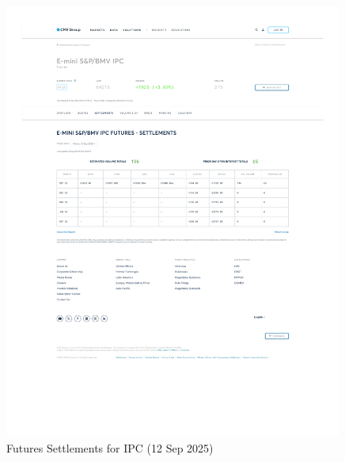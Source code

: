 \documentclass[11pt,a4paper]{article} %
\begin{document}
\begin{figure}[h]
  \centering
  \includegraphics[width=0.99\textwidth]{appendix/IPC12SEP.pdf}
  \caption{Futures Settlements for IPC (12 Sep 2025)}
  \label{fig:ipc_settlements}
\end{figure}
\end{document}
